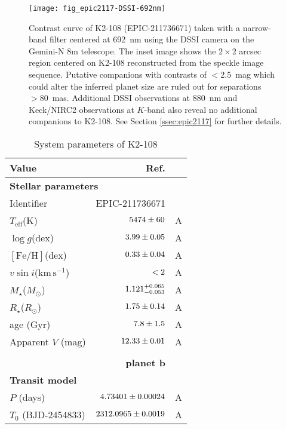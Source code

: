 \documentclass[preprint2]{aastex6}
\newcommand{\Mstar}{\ensuremath{M_{\star}}\xspace}
\newcommand{\Rstar}{\ensuremath{R_{\star}}\xspace}
\newcommand{\fe}{\ensuremath{\mathrm{[Fe/H]}}\xspace}
\newcommand{\teff}{$T_{\mathrm{eff}}$\xspace}
\newcommand{\logg}{\ensuremath{\log g}\xspace}
\newcommand{\vsini}{\ensuremath{v \sin i}\xspace}
\newcommand{\kms}{\ensuremath{\mathrm{km}\,\mathrm{s}^{-1}}\xspace}
\newcommand{\Rsun}{\ensuremath{R_{\odot}}\xspace }
\newcommand{\Msun}{\ensuremath{M_{\odot}}\xspace}
\begin{document}
\begin{figure}
\centering
\texttt{[image: fig\_epic2117-DSSI-692nm]}
\caption{Contrast curve of K2-108 (EPIC-211736671) taken with a narrow-band filter centered at 692~nm using the DSSI camera \citep{Horch12} on the Gemini-N 8m telescope. The inset image shows the $2 \times 2$ arcsec region centered on K2-108 reconstructed from the speckle image sequence. Putative companions with contrasts of $<$2.5~mag which could alter the inferred planet size are ruled out for separations $> 80$~mas. Additional DSSI observations at 880~nm and Keck/NIRC2 observations at $K$-band also reveal no additional companions to K2-108. See Section \ref{ssec:epic2117} for further details.\label{fig:epic2117-dssi}} 
\end{figure}

{\renewcommand{\arraystretch}{0.9}
\begin{table}
\centering
\caption{System parameters of K2-108 }
\begin{tabular}{lrr}
\hline
\hline
   {\rm Value }   & {\rm Ref.}  \\
\hline
    \multicolumn{3}{l}{{\bf Stellar parameters}} \\
    Identifier                  & EPIC-211736671                & \\
    \teff (K)                   & $\val{epic2117-star}{teff}$   & A \\
    \logg (dex)                 & $\val{epic2117-star}{logg}$   & A \\
    \fe (dex)                   & $\val{epic2117-star}{fe}$     & A \\
    \vsini (\kms)               & $\val{epic2117-star}{vsini}$  & A \\
    \Mstar (\Msun)              & $\val{epic2117-star}{mass}$   & A \\
    \Rstar (\Rsun)              & $\val{epic2117-star}{radius}$ & A \\
    age (Gyr)                   & $\val{epic2117-star}{agegyr}$ & A \\
    Apparent $V$ (mag)          & $\val{epic2117-star}{vmag}$   & A \\
    \\[-2ex]
    {} & {\bf planet b} &  \\ 
    \multicolumn{3}{l}{{\bf Transit model}} \\
    $P$ (days)           & $\val{epic2117-ecc}{P1}$      & A\\
    $T_0$ (BJD-2454833)  & $\val{epic2117-ecc}{T01}$     & A\\

\end{tabular}
\end{table}}
\end{document}
